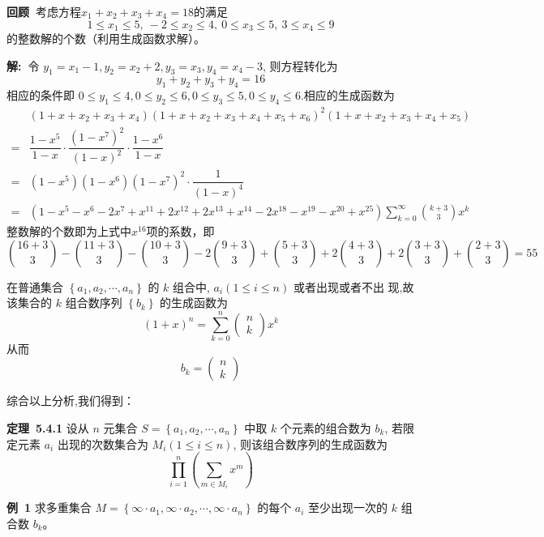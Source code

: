 \documentclass{report}
\begin{document}
\noindent
\textbf{回顾\ }考虑方程$ x_{1}+x_{2}+x_{3}+x_{4}=18 $的满足$$
1\leq x_{1}\leq 5,\ -2\leq x_{2}\leq 4,\ 0\leq x_{3}\leq 5,\ 3\leq x_{4}\leq 9
$$
的整数解的个数（利用生成函数求解）。

\noindent
\textbf{解:\ }令 $y_{1}=x_{1}-1, y_{2}=x_{2}+2, y_{3}=x_{3}, y_{4}=x_{4}-3$, 则方程转化为
$$
y_{1}+y_{2}+y_{3}+y_{4}=16
$$
相应的条件即 $0 \leq y_{1} \leq 4,0 \leq y_{2} \leq 6,0 \leq y_{3} \leq 5,0 \leq y_{4} \leq 6$.相应的生成函数为
$$\begin{aligned}
&(1+x+x_{2}+x_{3}+x_{4})(1+x+x_{2}+x_{3}+x_{4}+x_{5}+x_{6})^{2}(1+x+x_{2}+x_{3}+x_{4}+x_{5})\\
=&\dfrac{1-x^{5}}{1-x}\cdot\dfrac{(1-x^{7})^{2}}{(1-x)^{2}}\cdot\dfrac{1-x^{6}}{1-x}\\
=&(1-x^{5})(1-x^{6})(1-x^{7})^{2}\cdot\dfrac{1}{(1-x)^{4}}\\
=&(1-x^{5}-x^{6}-2x^{7}+x^{11}+2x^{12}+2x^{13}+x^{14}-2x^{18}-x^{19}-x^{20}+x^{25})\sum_{k=0}^{\infty}\binom{k+3}{3}x^{k}
\end{aligned} $$
整数解的个数即为上式中$x^{16}$项的系数，即
$$ \binom{16+3}{3}-\binom{11+3}{3}-\binom{10+3}{3}-2\binom{9+3}{3}+\binom{5+3}{3}+2\binom{4+3}{3}+2\binom{3+3}{3}+\binom{2+3}{3}=55$$


在普通集合 $\left\{a_{1}, a_{2}, \cdots, a_{n}\right\}$ 的 $k$ 组合中, $a_{i}(1 \leqslant i \leqslant n)$ 或者出现或者不出 现,故该集合的 $k$ 组合数序列 $\left\{b_{k}\right\}$ 的生成函数为
$$
(1+x)^{n}=\sum_{k=0}^{n}\left(\begin{array}{l}
n \\
k
\end{array}\right) x^{k}
$$
从而
$$
b_{k}=\left(\begin{array}{l}
n \\
k
\end{array}\right)
$$

综合以上分析,我们得到：

\noindent
\textbf{定理\ 5.4.1} 设从 $n$ 元集合 $S=\left\{a_{1}, a_{2}, \cdots, a_{n}\right\}$ 中取 $k$ 个元素的组合数为 $b_{k}$, 若限定元素 $a_{i}$ 出现的次数集合为 $M_{i}(1 \leqslant i \leqslant n)$, 则该组合数序列的生成函数为
$$
\prod_{i=1}^{n}\left(\sum_{m \in M_{i}} x^{m}\right)
$$

\noindent
\textbf{例\ 1}  求多重集合 $M=\left\{\infty \cdot a_{1}, \infty \cdot a_{2}, \cdots, \infty \cdot a_{n}\right\}$ 的每个 $a_{i}$ 至少出现一次的 $k$ 组合数 $b_{k}$。
\end{document}
